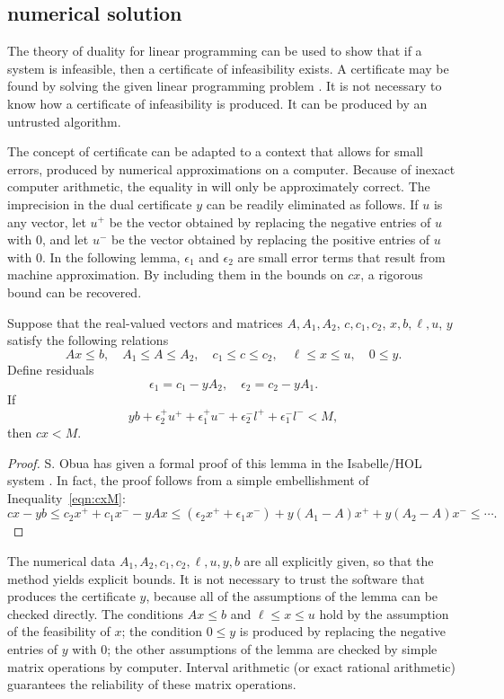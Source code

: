 \subsection{numerical solution}


The theory of duality for linear programming can be used to show that if a
system is infeasible, then a certificate of infeasibility exists.  A certificate
may be found by solving the given linear programming problem .
It is not necessary to know how a
certificate of infeasibility is produced.  It can be produced 
by an untrusted algorithm.  

The concept of certificate can be
adapted to a context that allows for small  errors, produced by
numerical approximations on a computer.
Because of inexact computer arithmetic, the
equality in  will only be approximately correct. The imprecision in the
dual certificate $y$ can be readily eliminated as follows. If $u$ is any
vector, let $u^+$ be the vector obtained by replacing the negative
entries of $u$ with $0$, and let $u^-$ be the vector obtained by
replacing the positive entries of $u$ with $0$.  In the
following lemma, $\epsilon_1$ and $\epsilon_2$ are small error terms
that result from machine approximation. By including them in the
bounds on $c x$, a rigorous bound can be recovered.


\begin{lemma}  Suppose that the real-valued vectors and matrices
$A,A_1,A_2$, $c,c_1,c_2$, $x,b,\ell,u$, $y$ satisfy the following
relations
  $$
  A x\le b, \quad A_1 \le A \le A_2,
  \quad c_1 \le c \le c_2,\quad \ell\le x\le u,\quad
  0\le y.
  $$
Define residuals
  $$
   \epsilon_1 = c_1 - y A_2,\quad \epsilon_2 = c_2  - y A_1.
  $$
If
$$
y b + \epsilon_2^+ u^+ + \epsilon_1^+ u^- + \epsilon_2^- l^+ + \epsilon_1^- l^- < M,
$$
then $c x < M$.
\end{lemma}

\begin{proof} S. Obua has given a formal proof of this lemma in the
Isabelle/HOL system \cite[3.7.2]{Obua:2008:Thesis}. In fact, the proof
follows from a simple embellishment of Inequality~\ref{eqn:cxM}:
$$c x -y b\le c_2 x^+ + c_1 x^- -y A x\le (\epsilon_2 x^+ + \epsilon_1 x^-)
  + y (A_1-A) x^+ + y (A_2 - A) x^- \le \cdots.$$
\end{proof}

The numerical data $A_1,A_2,c_1,c_2,\ell,u,y,b$ are all explicitly given,
so that the method yields explicit bounds.
It is not necessary to trust the software
that produces the certificate $y$, because
all of the assumptions of the lemma can be checked directly.
The conditions $A x \le b$ and $\ell\le x\le u$ hold by the assumption
of the feasibility of $x$; the condition $0\le y$ is produced by replacing the
negative entries of $y$ with $0$; the other assumptions of the lemma are
checked by simple matrix operations by computer.  Interval arithmetic 
(or exact rational arithmetic) guarantees
the reliability of these matrix
operations.

